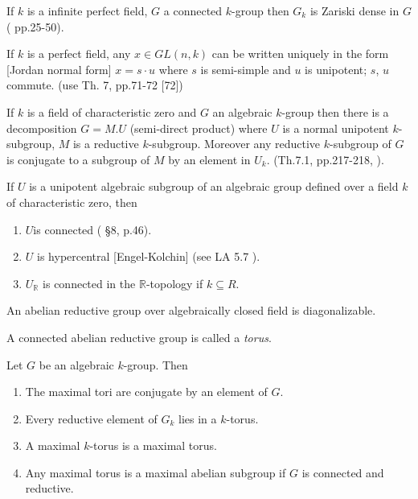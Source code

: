 \begin{thm}[Rosenlicht]\label{chap0:thm0.3} %
  If $k$ is a infinite perfect field, $G$ a connected $k$-group then
  $G_k$ is Zariski dense in $G$ (\cite{18} pp.25-50). 
\end{thm}

\begin{prop}\label{chap0:prop0.4} %
  If $k$ is a perfect field, any $x \in GL (n, k)$ can be written
  uniquely in the form [Jordan normal form] $x = s \cdot u$ where $s$
  is semi-simple and $u$ is unipotent; $s$, $u$ commute. (use Th. 7,
  pp.71-72 [72])
\end{prop}

\begin{thm}\label{chap0:thm0.5} %
  If $k$ is a field of characteristic zero and $G$ an algebraic
  $k$-group then there is a decomposition $G= M.U$ (semi-direct
  product) where $U$ is a normal unipotent $k$-subgroup, $M$ is a
  reductive $k$-subgroup. Moreover any reductive $k$-subgroup of $G$
  is conjugate to a subgroup of $M$ by an element in $U_k$. (Th.7.1,
  pp.217-218, \cite{15}).
\end{thm}

\begin{prop}\label{chap0:prop0.6} %
  If $U$ is a unipotent algebraic subgroup of an algebraic group
  defined over a field $k$ of characteristic zero, then 
  \begin{enumerate}[\rm 1.]
    \item $U$\pageoriginale is connected (\cite{2} \S 8, p.46).
      \item $U$ is hypercentral [Engel-Kolchin] (see LA 5.7
        \cite{22}).
        \item $U_{\mathbb{R}}$ is connected in the
          $\mathbb{R}$-topology if $k \subseteq R$.
  \end{enumerate}
\end{prop}

\begin{prop}\label{chap0:prop0.7} %
  An abelian reductive group over algebraically closed field is
  diagonalizable. 
\end{prop}

\begin{defi*}
  A connected abelian reductive group is called a \textit{torus}.
\end{defi*}

\begin{thm}\label{chap0:thm0.8} %
  Let $G$ be an algebraic $k$-group. Then
  \begin{enumerate}[\rm 1.]
    \item The maximal tori are conjugate by an element of $G$.
      \item Every reductive element of $G_k$ lies in a $k$-torus.
        \item A maximal $k$-torus is a maximal torus.
          \item Any maximal torus is a maximal abelian subgroup if $G$
            is connected and reductive.
  \end{enumerate}
\end{thm}

